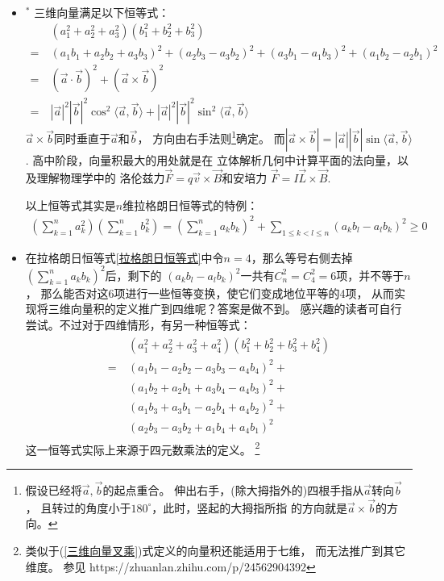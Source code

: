 \begin{itemize}[leftmargin=\inteval{\myitemleftmargin}pt,itemsep=
   \inteval{\myitemitempsep}pt,topsep=\inteval{\myitemtopsep}pt]
\item $^*$ 三维向量满足以下恒等式：
\begin{align*}
    &\ (a_1^2+a_2^2+a_3^2)(b_1^2+b_2^2+b_3^2)\\
    =&\  (a_1b_1+a_2b_2+a_3b_3)^2+
    (a_2b_3-a_3b_2)^2+(a_3b_1-a_1b_3)^2+(a_1b_2-a_2b_1)^2 \\
    =&\ (\vec{a}\cdot \vec{b})^2+(\vec{a}\times\vec{b})^2 \\
    =&\ |\vec{a}|^2|\vec{b}|^2\cos^2\langle\vec{a},\vec{b}\rangle 
    +|\vec{a}|^2|\vec{b}|^2\sin^2\langle\vec{a},\vec{b}\rangle
\end{align*} 
$ \vec{a}\times\vec{b} $同时垂直于$ \vec{a} $和$ \vec{b} $，
方向由右手法则\footnote{
    假设已经将$ \vec{a},\vec{b} $的起点重合。
    伸出右手，(除大拇指外的)四根手指从$ \vec{a} $转向$ \vec{b} $，
    且转过的角度小于$ 180^{\circ} $，此时，竖起的大拇指所指
    的方向就是$ \vec{a}\times\vec{b} $的方向。}确定。
而$ |\vec{a}\times\vec{b}|=|\vec{a}||\vec{b}|\sin\langle\vec{a},
\vec{b}\rangle $. 高中阶段，向量积最大的用处就是在
立体解析几何中计算平面的法向量，以及理解物理学中的
洛伦兹力$ \vec{F}=q\vec{v}\times \vec{B} $和安培力
$ \vec{F}=I\vec{L}\times \vec{B} $. 

以上恒等式其实是$ n $维拉格朗日恒等式的特例：
\begin{gather}\label{拉格朗日恒等式}
    \left(\sum_{k=1}^{n}a_k^2 \right) \left(\sum_{k=1}^{n}b_k^2 \right)=\left( 
    \sum_{k=1}^{n}a_kb_k\right)^2 +\sum_{1\leq k<l\leq n }\left( 
    a_kb_l-a_lb_k\right)^2 \geq 0  
\end{gather}

\item 在拉格朗日恒等式\eqref{拉格朗日恒等式}中令$ n=4 $，那么等号右侧去掉
$ \left( \sum\limits_{k=1}^{n}a_kb_k\right)^2 $后，剩下的
$ \left( a_kb_l-a_lb_k\right)^2 $一共有$ C_n^2=C_4^2=6 $项，并不等于$ n $，
那么能否对这6项进行一些恒等变换，使它们变成地位平等的4项，
从而实现将三维向量积的定义推广到四维呢？答案是做不到。
感兴趣的读者可自行尝试。不过对于四维情形，有另一种恒等式：
\begin{align}\label{四元数乘法导出的恒等式}
 \begin{aligned}   
    &(a_1^2+a_2^2+a_3^2+a_4^2)(b_1^2+b_2^2+b_3^2+b_4^2) \\
    =\ &(a_1b_1-a_2b_2-a_3b_3-a_4b_4)^2+\\
    &(a_1b_2+a_2b_1+a_3b_4-a_4b_3)^2+\\
    &(a_1b_3+a_3b_1-a_2b_4+a_4b_2)^2+\\
    &(a_2b_3-a_3b_2+a_1b_4+a_4b_1)^2
 \end{aligned}
\end{align}
这一恒等式实际上来源于四元数乘法的定义。
\footnote{ 类似于(\ref{三维向量叉乘})式定义的向量积还能适用于七维，
    而无法推广到其它维度。
参见 https://zhuanlan.zhihu.com/p/24562904392 }


\end{itemize}
